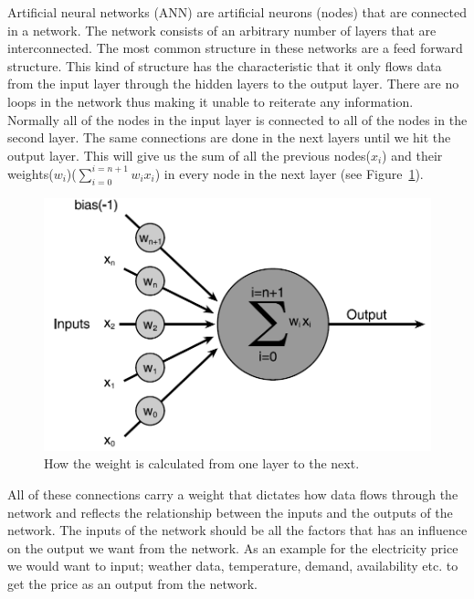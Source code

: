 Artificial neural networks (ANN) are artificial neurons (nodes) that are connected in a network. The network consists of an arbitrary number of layers that are interconnected. The most common structure in these networks are a feed forward structure. This kind of structure has the characteristic that it only flows data from the input layer through the hidden layers to the output layer. There are no loops in the network thus making it unable to reiterate any information. Normally all of the nodes in the input layer is connected to all of the nodes in the second layer. The same connections are done in the next layers until we hit the output layer. This will give us the sum of all the previous nodes($x_i$) and their weights($w_i$)($\sum_{i=0}^{i=n+1} w_i x_i$) in every node in the next layer (see Figure~\ref{fig:weight_of_layers}).
\begin{figure}[!ht]
\centering
\includegraphics[width=0.8\linewidth]{billeder/weight_of_layers.png}
\caption{How the weight is calculated from one layer to the next. \cite[P. 251]{buckland2002ai}}
\label{fig:weight_of_layers}
\end{figure}
All of these connections carry a weight that dictates how data flows through the network and reflects the relationship between the inputs and the outputs of the network. The inputs of the network should be all the factors that has an influence on the output we want from the network. As an example for the electricity price we would want to input; weather data, temperature, demand, availability etc. \cite{21} to get the price as an output from the network. 

